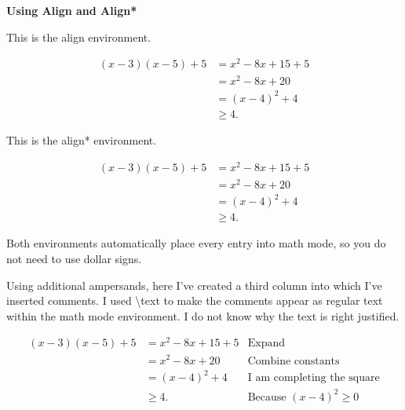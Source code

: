 \documentclass[12pt]{article}
\begin{document}
\noindent
{\bf\large Using Align and Align*}

\bigskip

This is the align environment. 

\begin{align}
(x-3)(x-5)+5 & = x^2-8x+15+5\\
& = x^2-8x+20\\
& = (x-4)^2+4\\
& \geq 4.
\end{align}

This is the align* environment.

\begin{align*}
(x-3)(x-5)+5 & = x^2-8x+15+5\\
& = x^2-8x+20\\
& = (x-4)^2+4\\
& \geq 4.
\end{align*}

Both environments automatically place every entry into math mode, so you do not need to use dollar signs.

Using additional ampersands, here I've created a third column into which I've inserted comments. I used \textbackslash text to make the comments appear as regular text within the math mode environment. I do not know why the text is right justified.

\begin{align*}
(x-3)(x-5)+5 & = x^2-8x+15+5 & \text{Expand} \\
& = x^2-8x+20 & \text{Combine constants}\\
& = (x-4)^2+4 & \text{I am completing the square}\\
& \geq 4. & \text{Because $(x-4)^2\geq 0$}
\end{align*}
\end{document}
